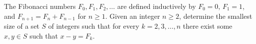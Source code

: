 The Fibonacci numbers $F_0, F_1, F_2, \ldots$ are defined inductively by $F_0 = 0$, $F_1 = 1$, and $F_{n+1} = F_n + F_{n-1}$ for $n \geqslant 1$. Given an integer $n \geqslant 2$, determine the smallest size of a set $S$ of integers such that for every $k = 2, 3, \ldots, n$ there exist some $x, y \in S$ such that $x - y = F_k$.
